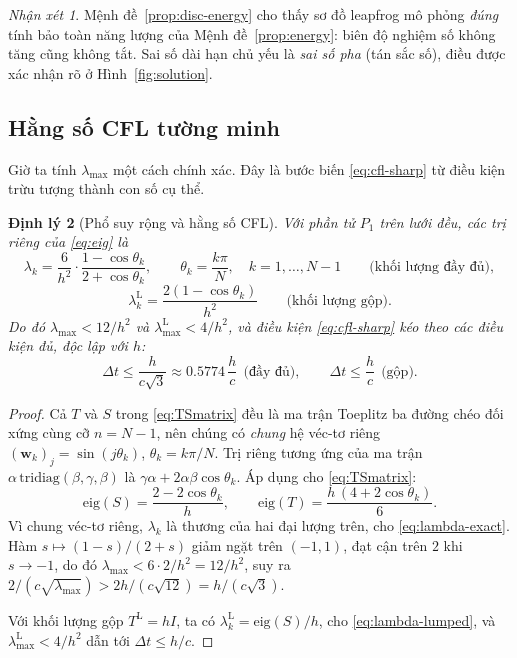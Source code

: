\documentclass[11pt,a4paper]{article}
\theoremstyle{plain}
\newtheorem{theorem}{Định lý}[section]
\theoremstyle{definition}
\theoremstyle{remark}
\newtheorem{remark}[theorem]{Nhận xét}
\newcommand{\dt}{\Delta t}
\newcommand{\lammax}{\lambda_{\max}}
\begin{document}
\begin{remark}
Mệnh đề~\ref{prop:disc-energy} cho thấy sơ đồ leapfrog mô phỏng \emph{đúng} tính
bảo toàn năng lượng của Mệnh đề~\ref{prop:energy}: biên độ nghiệm số không tăng
cũng không tắt. Sai số dài hạn chủ yếu là \emph{sai số pha} (tán sắc số),
điều được xác nhận rõ ở Hình~\ref{fig:solution}.
\end{remark}

\subsection{Hằng số CFL tường minh}

Giờ ta tính $\lammax$ một cách chính xác. Đây là bước biến
\eqref{eq:cfl-sharp} từ điều kiện trừu tượng thành con số cụ thể.

\begin{theorem}[Phổ suy rộng và hằng số CFL]
\label{thm:spectrum}
Với phần tử $P_{1}$ trên lưới đều, các trị riêng của \eqref{eq:eig} là
\begin{equation}
\label{eq:lambda-exact}
  \lambda_{k} = \frac{6}{h^{2}}\cdot
     \frac{1 - \cos\theta_{k}}{2 + \cos\theta_{k}},
  \qquad \theta_{k} = \frac{k\pi}{N},\quad k = 1,\dots,N-1
  \qquad\text{(khối lượng đầy đủ)},
\end{equation}
\begin{equation}
\label{eq:lambda-lumped}
  \lambda_{k}^{\mathrm{L}} = \frac{2(1 - \cos\theta_{k})}{h^{2}}
  \qquad\text{(khối lượng gộp)} .
\end{equation}
Do đó $\lammax < 12/h^{2}$ và $\lammax^{\mathrm{L}} < 4/h^{2}$, và điều kiện
\eqref{eq:cfl-sharp} kéo theo các điều kiện đủ, độc lập với $h$:
\begin{equation}
\label{eq:cfl-two}
  \boxed{\;
  \dt \le \frac{h}{c\sqrt{3}} \approx 0.5774\,\frac{h}{c}
  \ \ \text{(đầy đủ)},
  \qquad
  \dt \le \frac{h}{c}
  \ \ \text{(gộp)}. \;}
\end{equation}
\end{theorem}

\begin{proof}
Cả $T$ và $S$ trong \eqref{eq:TSmatrix} đều là ma trận Toeplitz ba đường chéo
đối xứng cùng cỡ $n = N-1$, nên chúng có \emph{chung} hệ véc-tơ riêng
$(\bm{w}_{k})_{j} = \sin(j\theta_{k})$, $\theta_{k} = k\pi/N$. Trị riêng
tương ứng của ma trận $\alpha\,\mathrm{tridiag}(\beta,\gamma,\beta)$ là
$\gamma\alpha + 2\alpha\beta\cos\theta_{k}$. Áp dụng cho \eqref{eq:TSmatrix}:
\[
  \text{eig}(S) = \frac{2 - 2\cos\theta_{k}}{h},
  \qquad
  \text{eig}(T) = \frac{h\,(4 + 2\cos\theta_{k})}{6}.
\]
Vì chung véc-tơ riêng, $\lambda_{k}$ là thương của hai đại lượng trên, cho
\eqref{eq:lambda-exact}. Hàm $s \mapsto (1-s)/(2+s)$ giảm ngặt trên
$(-1,1)$, đạt cận trên $2$ khi $s \to -1$, do đó
$\lammax < 6\cdot 2/h^{2} = 12/h^{2}$, suy ra
$2/(c\sqrt{\lammax}) > 2h/(c\sqrt{12}) = h/(c\sqrt{3})$.

Với khối lượng gộp $T^{\mathrm{L}} = hI$, ta có
$\lambda_{k}^{\mathrm{L}} = \text{eig}(S)/h$, cho \eqref{eq:lambda-lumped},
và $\lammax^{\mathrm{L}} < 4/h^{2}$ dẫn tới $\dt \le h/c$.
\end{proof}
\end{document}
